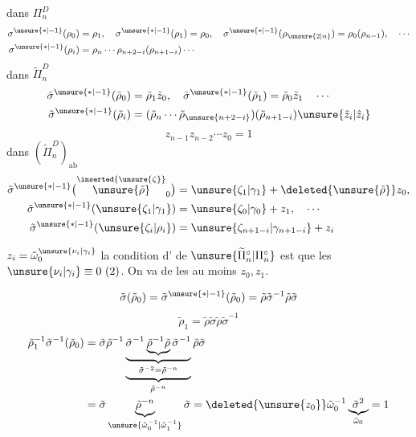 dans $\Pi_n^D$
\[
\begin{aligned}
\sigma^{\unsure{\ast|-1}}(\rho_0)&=\rho_1,\quad
\sigma^{\unsure{\ast|-1}}(\rho_1)=\rho_0,\quad
\sigma^{\unsure{\ast|-1}}(\rho_{\unsure{2|n}})=\rho_0(\rho_{n-1}),\quad\cdots\\
\sigma^{\unsure{\ast|-1}}(\rho_i)&=\rho_n\cdots\rho_{n+2-i}(\rho_{n+1-i})\cdots
\end{aligned}
\]
dans $\widetilde\Pi_n^D$
\[
\begin{aligned}
\tilde\sigma^{\unsure{\ast|-1}}(\tilde\rho_0)&=\tilde\rho_1\tilde z_0,\quad
\tilde\sigma^{\unsure{\ast|-1}}(\tilde\rho_1)=\tilde\rho_0\tilde z_1\quad\cdots\\
\tilde\sigma^{\unsure{\ast|-1}}(\tilde\rho_i)&=
(\tilde\rho_n\cdots\tilde\rho_{\unsure{n+2-i}})(\tilde\rho_{n+1-i})\unsure{\tilde z_i|\hat z_i}
\end{aligned}
\]
\[
z_{n-1}z_{n-2}\cdots z_0=1
\]
dans $(\widetilde\Pi_n^D)_{\mathrm{ab}}$
\[
\begin{aligned}
\tilde\sigma^{\unsure{\ast|-1}}
\bigl(\overset{\inserted{\unsure{\zeta}}}{\unsure{\tilde\rho}}_0\bigr)
&=\unsure{\zeta_1|\gamma_1}+\deleted{\unsure{\tilde\rho}}z_0,\\
\tilde\sigma^{\unsure{\ast|-1}}(\unsure{\zeta_1|\gamma_1})
&=\unsure{\zeta_0|\gamma_0}+z_1,\quad\cdots\\
\tilde\sigma^{\unsure{\ast|-1}}(\unsure{\zeta_i|\rho_i})
&=\unsure{\zeta_{n+1-i}|\gamma_{n+1-i}}+z_i
\end{aligned}
\]

$z_i=\tilde\omega_0^{\unsure{\nu_i|\gamma_i}}$
la condition d' de $\unsure{\widetilde\Pi_n^\circ|\Pi_n^\circ}$ est
que les $\unsure{\nu_i|\gamma_i}\equiv0\ (2)$.
On va  de les  au moins $z_0,z_1$.

\[
\tilde\sigma(\tilde\rho_0)
=\tilde\sigma^{\unsure{\ast|-1}}(\tilde\rho_0)
=\tilde\rho\tilde\sigma^{-1}\tilde\rho\tilde\sigma
\]
\[
\tilde\rho_1=\tilde\rho\tilde\sigma\tilde\rho\tilde\sigma^{-1}
\]
\[
\begin{aligned}
\tilde\rho_1^{-1}\tilde\sigma^{-1}(\tilde\rho_0)
&=\tilde\sigma\tilde\rho^{-1}
\underbrace{\underbrace{\tilde\sigma^{-1}
\underbrace{\tilde\rho^{-1}\tilde\rho}\tilde\sigma^{-1}}_{
\tilde\sigma^{-2}=\tilde\rho^{-n}}}_{\tilde\rho^{-n}}
\tilde\rho\tilde\sigma\\
&=\tilde\sigma\underbrace{\tilde\rho^{-n}}_{
\unsure{\tilde\omega_0^{-1}|\tilde\omega_1^{-1}}}\tilde\sigma
=\deleted{\unsure{z_0}}\tilde\omega_0^{-1}\underbrace{\tilde\sigma^2}_{\tilde\omega_0}=1
\end{aligned}
\]
\margin{\deleted{$\unsure{\tilde\rho}$}}

